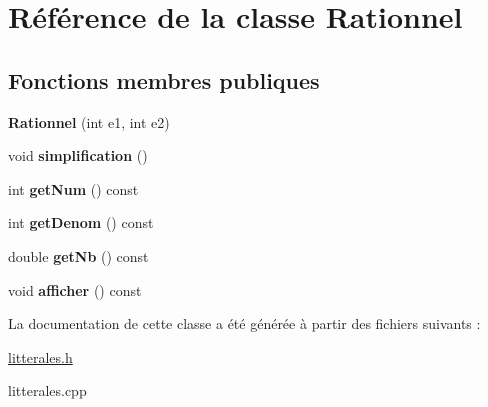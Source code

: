 \hypertarget{class_rationnel}{\section{Référence de la classe Rationnel}
\label{class_rationnel}
}
\subsection*{Fonctions membres publiques}
\begin{DoxyCompactItemize}
\item 
\hypertarget{class_rationnel_aa93d09cbce84a8515f2535014415e591}{{\bfseries Rationnel} (int e1, int e2)}\label{class_rationnel_aa93d09cbce84a8515f2535014415e591}

\item 
\hypertarget{class_rationnel_a90d440a5d909748f5fda471e027e3a85}{void {\bfseries simplification} ()}\label{class_rationnel_a90d440a5d909748f5fda471e027e3a85}

\item 
\hypertarget{class_rationnel_ac9596f5d24cef6120c0cabcd7923aa29}{int {\bfseries get\-Num} () const }\label{class_rationnel_ac9596f5d24cef6120c0cabcd7923aa29}

\item 
\hypertarget{class_rationnel_a3809b3a6ac86e4b0a87bbf49f03dac6c}{int {\bfseries get\-Denom} () const }\label{class_rationnel_a3809b3a6ac86e4b0a87bbf49f03dac6c}

\item 
\hypertarget{class_rationnel_a9c96ebc33a9c6900080af3fe44053304}{double {\bfseries get\-Nb} () const }\label{class_rationnel_a9c96ebc33a9c6900080af3fe44053304}

\item 
\hypertarget{class_rationnel_ae8120da1413be292347b924a7213529a}{void {\bfseries afficher} () const }\label{class_rationnel_ae8120da1413be292347b924a7213529a}

\end{DoxyCompactItemize}


La documentation de cette classe a été générée à partir des fichiers suivants \-:\begin{DoxyCompactItemize}
\item 
\hyperlink{litterales_8h}{litterales.\-h}\item 
litterales.\-cpp\end{DoxyCompactItemize}
